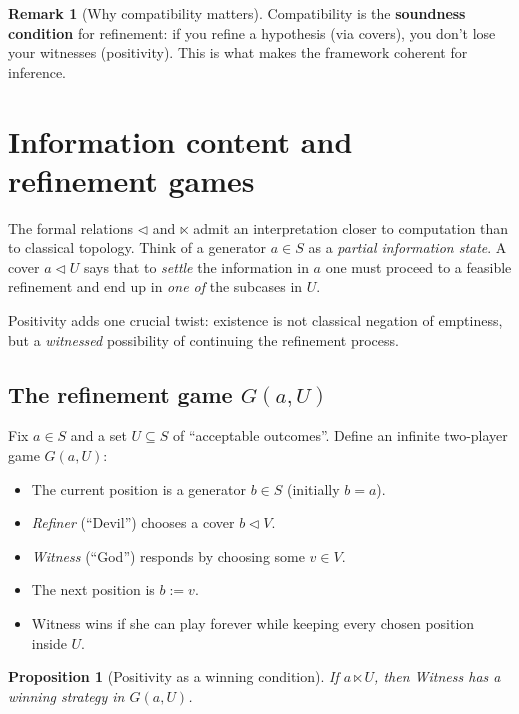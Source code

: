 \documentclass[11pt]{article}
\theoremstyle{definition}
\newtheorem{remark}[definition]{Remark}
\theoremstyle{plain}
\newtheorem{proposition}[definition]{Proposition}
\newcommand{\ltimesrel}{\ltimes}
\newcommand{\covers}{\triangleleft}
\begin{document}
\begin{remark}[Why compatibility matters]
Compatibility is the \textbf{soundness condition} for refinement:
if you refine a hypothesis (via covers), you don't lose your witnesses (positivity).
This is what makes the framework coherent for inference.
\end{remark}

\section{Information content and refinement games}\label{sec:info-games}

The formal relations $\covers$ and $\ltimesrel$ admit an interpretation closer to computation than to classical topology.
Think of a generator $a\in S$ as a \emph{partial information state}.  A cover $a\covers U$
says that to \emph{settle} the information in $a$ one must proceed to a feasible refinement and end up in \emph{one of} the subcases in $U$.

Positivity adds one crucial twist: existence is not classical negation of emptiness, but a \emph{witnessed} possibility of continuing the refinement process.

\subsection{The refinement game $G(a,U)$}

Fix $a\in S$ and a set $U\subseteq S$ of ``acceptable outcomes''.
Define an infinite two-player game $G(a,U)$:

\begin{itemize}
  \item The current position is a generator $b\in S$ (initially $b=a$).
  \item \emph{Refiner} (``Devil'') chooses a cover $b\covers V$.
  \item \emph{Witness} (``God'') responds by choosing some $v\in V$.
  \item The next position is $b:=v$.
  \item Witness wins if she can play forever while keeping every chosen position inside $U$.
\end{itemize}

\begin{proposition}[Positivity as a winning condition]\label{prop:positivity-game}
If $a\ltimesrel U$, then Witness has a winning strategy in $G(a,U)$.
\end{proposition}
\end{document}
